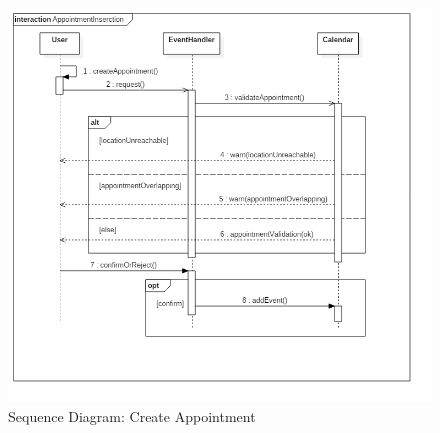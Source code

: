 \begin{figure}[H]
	\centering
	\includegraphics[width=6in]{./diagrams/AppointmentInserction.png}
	\caption{Sequence Diagram: Create Appointment}
	\label{fig:SequenceAddApp}
\end{figure}